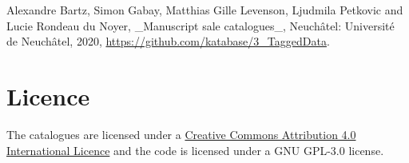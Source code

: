 Alexandre Bartz, Simon Gabay, Matthias Gille Levenson, Ljudmila Petkovic and Lucie Rondeau du Noyer, \_Manuscript sale catalogues\_, Neuchâtel: Université de Neuchâtel, 2020, \href{https://github.com/katabase/3\_TaggedData}{https://github.com/katabase/3\_TaggedData}.
\section*{Licence}

The catalogues are licensed under a \href{http://creativecommons.org/licenses/by/4.0/}{Creative Commons Attribution 4.0 International Licence} and the code is licensed under a GNU GPL-3.0 license.